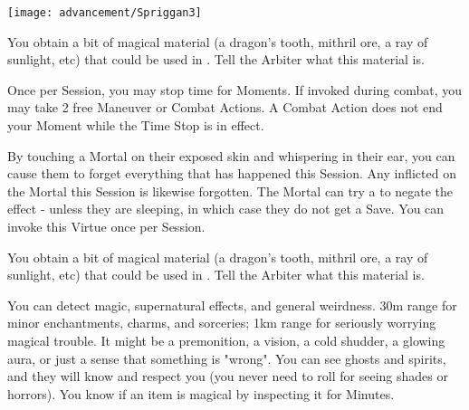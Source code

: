 \begin{center}
\texttt{[image: advancement/Spriggan3]}
\end{center}

\begin{multicols*}{2}


You obtain a bit of magical material (a dragon's tooth, mithril ore, a ray of sunlight, etc) that could be used in .  Tell the Arbiter what this material is.


Once per Session, you may stop time for Moments. If invoked during combat, you may take 2 free Maneuver or Combat Actions. A Combat Action does not end your Moment while the Time Stop is in effect.

\cbreak


By touching a Mortal on their exposed skin and whispering in their ear, you can cause them to forget everything that has happened this Session. Any  inflicted on the Mortal this Session is likewise forgotten. The Mortal can try a  to negate the effect - unless they are sleeping, in which case they do not get a Save. You can invoke this Virtue once per Session.


You obtain a bit of magical material (a dragon's tooth, mithril ore, a ray of sunlight, etc) that could be used in .  Tell the Arbiter what this material is.



You can detect magic, supernatural effects, and general weirdness. 30m range for minor enchantments, charms, and sorceries; 1km range for seriously worrying magical trouble. It might be a premonition, a vision, a cold shudder, a glowing aura, or just a sense that something is "wrong". You can see ghosts and spirits, and they will know and respect you (you never need to roll \INSANITY for seeing shades or horrors). You know if an item is magical by inspecting it for Minutes.


\end{multicols*}
